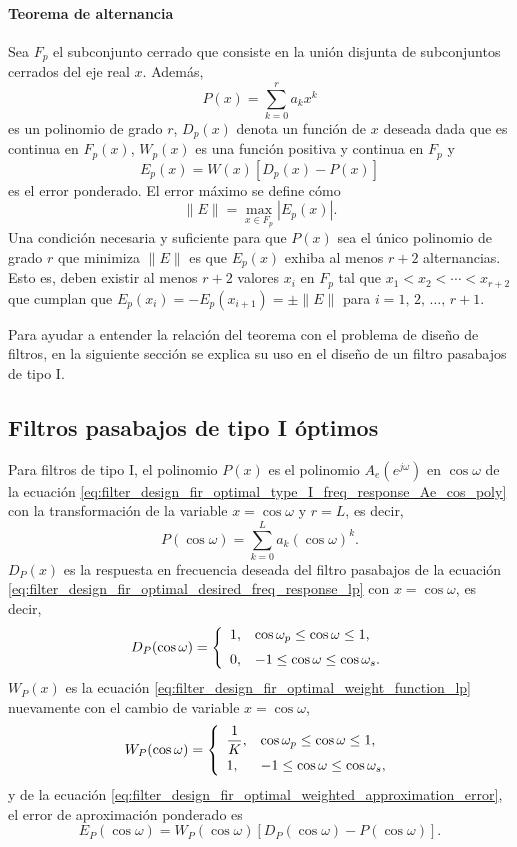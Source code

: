 \documentclass[a4paper]{report}
\begin{document}
\paragraph{Teorema de alternancia} Sea \(F_p\) el subconjunto cerrado que consiste en la unión disjunta de subconjuntos cerrados del eje real \(x\). Además,
\[
 P(x)=\sum_{k=0}^ra_kx^k
\]
es un polinomio de grado \(r\), \(D_p(x)\) denota un función de \(x\) deseada dada que es continua en \(F_p(x)\), \(W_p(x)\) es una función positiva y continua en \(F_p\) y 
\[
 E_p(x)=W(x)[D_p(x)-P(x)]
\]
es el error ponderado. El error máximo se define cómo
\[
 \|E\|=\max_{x\in F_p}|E_p(x)|.
\]
Una condición necesaria y suficiente para que \(P(x)\) sea el único polinomio de grado \(r\) que minimiza \(\|E\|\) es que \(E_p(x)\) exhiba al menos \(r+2\) alternancias. Esto es, deben existir al menos \(r+2\) valores \(x_i\) en \(F_p\) tal que \(x_1<x_2<\cdots<x_{r+2}\) que cumplan que \(E_p(x_i)=-E_p(x_{i+1})=\pm\|E\|\) para \(i=1,\,2,\,\dots,\,r+1\).

Para ayudar a entender la relación del teorema con el problema de diseño de filtros, en la siguiente sección se explica su uso en el diseño de un filtro pasabajos de tipo I.

\subsection{Filtros pasabajos de tipo I óptimos}\label{sec:filter_design_optimum_lowpass_fir_type_I}

Para filtros de tipo I, el polinomio \(P(x)\) es el polinomio \(A_e(e^{j\omega})\) en \(\cos\omega\) de la ecuación  \ref{eq:filter_design_fir_optimal_type_I_freq_response_Ae_cos_poly} con la transformación de la variable \(x=\cos\omega\) y \(r=L\), es decir,
\begin{equation}\label{eq:filter_design_fir_optimal_alternance_theorem_polynomial}
 P(\cos\omega)=\sum_{k=0}^La_k(\cos\omega)^k. 
\end{equation}
\(D_P(x)\) es la respuesta en frecuencia deseada del filtro pasabajos de la ecuación  \ref{eq:filter_design_fir_optimal_desired_freq_response_lp} con \(x=\cos\omega\), es decir,
\[
 D_P(\cos\omega)=
 \left\{ 
 \begin{array}{ll}
  1, & \cos\omega_p\leq \cos\omega\leq1,\\[\medskipamount]
  0, & -1\leq \cos\omega\leq\cos\omega_s.
 \end{array}
 \right. 
\]
\(W_P(x)\) es la ecuación \ref{eq:filter_design_fir_optimal_weight_function_lp} nuevamente con el cambio de variable \(x=\cos\omega\),
\[
 W_P(\cos\omega)=
 \left\{ 
 \begin{array}{ll}
  \dfrac{1}{K}, & \cos\omega_p\leq \cos\omega\leq1,\\[\medskipamount]
  1, & -1\leq \cos\omega\leq\cos\omega_s,
 \end{array}
 \right. 
\]
y de la ecuación \ref{eq:filter_design_fir_optimal_weighted_approximation_error}, el error de aproximación ponderado es
\begin{equation}\label{eq:filter_design_fir_optimal_alternance_weighted_approximation_error}
 E_P(\cos\omega)=W_P(\cos\omega)[D_P(\cos\omega)-P(\cos\omega)]. 
\end{equation}
\end{document}
